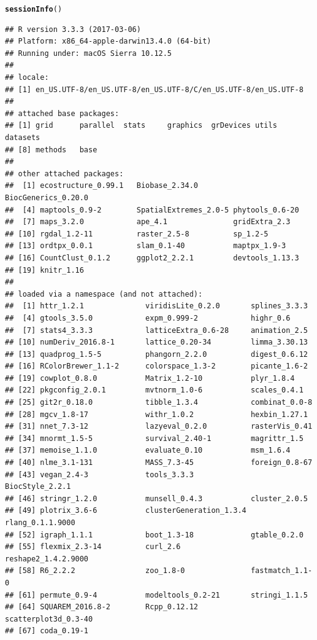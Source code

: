 \documentclass[12pt]{article}\usepackage[]{graphicx}\usepackage[usenames,dvipsnames]{color}
\makeatletter
\newcommand{\hlstd}[1]{\textcolor[rgb]{0.345,0.345,0.345}{#1}}%
\newcommand{\hlkwd}[1]{\textcolor[rgb]{0.737,0.353,0.396}{\textbf{#1}}}%
\newenvironment{kframe}{%
 \def\at@end@of@kframe{}%
 \ifinner\ifhmode%
  \def\at@end@of@kframe{\end{minipage}}%
  \begin{minipage}{\columnwidth}%
 \fi\fi%
 \def\FrameCommand##1{\hskip\@totalleftmargin \hskip-\fboxsep
 \colorbox{shadecolor}{##1}\hskip-\fboxsep
     \hskip-\linewidth \hskip-\@totalleftmargin \hskip\columnwidth}%
 \MakeFramed {\advance\hsize-\width
   \@totalleftmargin\z@ \linewidth\hsize
   \@setminipage}}%
 {\par\unskip\endMakeFramed%
 \at@end@of@kframe}
\newenvironment{knitrout}{}{} %
\makeatother
\begin{document}
\begin{knitrout}
\color{fgcolor}\begin{kframe}
\begin{alltt}
\hlkwd{sessionInfo}\hlstd{()}
\end{alltt}
\begin{verbatim}
## R version 3.3.3 (2017-03-06)
## Platform: x86_64-apple-darwin13.4.0 (64-bit)
## Running under: macOS Sierra 10.12.5
## 
## locale:
## [1] en_US.UTF-8/en_US.UTF-8/en_US.UTF-8/C/en_US.UTF-8/en_US.UTF-8
## 
## attached base packages:
## [1] grid      parallel  stats     graphics  grDevices utils     datasets 
## [8] methods   base     
## 
## other attached packages:
##  [1] ecostructure_0.99.1   Biobase_2.34.0        BiocGenerics_0.20.0  
##  [4] maptools_0.9-2        SpatialExtremes_2.0-5 phytools_0.6-20      
##  [7] maps_3.2.0            ape_4.1               gridExtra_2.3        
## [10] rgdal_1.2-11          raster_2.5-8          sp_1.2-5             
## [13] ordtpx_0.0.1          slam_0.1-40           maptpx_1.9-3         
## [16] CountClust_0.1.2      ggplot2_2.2.1         devtools_1.13.3      
## [19] knitr_1.16           
## 
## loaded via a namespace (and not attached):
##  [1] httr_1.2.1              viridisLite_0.2.0       splines_3.3.3          
##  [4] gtools_3.5.0            expm_0.999-2            highr_0.6              
##  [7] stats4_3.3.3            latticeExtra_0.6-28     animation_2.5          
## [10] numDeriv_2016.8-1       lattice_0.20-34         limma_3.30.13          
## [13] quadprog_1.5-5          phangorn_2.2.0          digest_0.6.12          
## [16] RColorBrewer_1.1-2      colorspace_1.3-2        picante_1.6-2          
## [19] cowplot_0.8.0           Matrix_1.2-10           plyr_1.8.4             
## [22] pkgconfig_2.0.1         mvtnorm_1.0-6           scales_0.4.1           
## [25] git2r_0.18.0            tibble_1.3.4            combinat_0.0-8         
## [28] mgcv_1.8-17             withr_1.0.2             hexbin_1.27.1          
## [31] nnet_7.3-12             lazyeval_0.2.0          rasterVis_0.41         
## [34] mnormt_1.5-5            survival_2.40-1         magrittr_1.5           
## [37] memoise_1.1.0           evaluate_0.10           msm_1.6.4              
## [40] nlme_3.1-131            MASS_7.3-45             foreign_0.8-67         
## [43] vegan_2.4-3             tools_3.3.3             BiocStyle_2.2.1        
## [46] stringr_1.2.0           munsell_0.4.3           cluster_2.0.5          
## [49] plotrix_3.6-6           clusterGeneration_1.3.4 rlang_0.1.1.9000       
## [52] igraph_1.1.1            boot_1.3-18             gtable_0.2.0           
## [55] flexmix_2.3-14          curl_2.6                reshape2_1.4.2.9000    
## [58] R6_2.2.2                zoo_1.8-0               fastmatch_1.1-0        
## [61] permute_0.9-4           modeltools_0.2-21       stringi_1.1.5          
## [64] SQUAREM_2016.8-2        Rcpp_0.12.12            scatterplot3d_0.3-40   
## [67] coda_0.19-1
\end{verbatim}
\end{kframe}
\end{knitrout}
\end{document}
